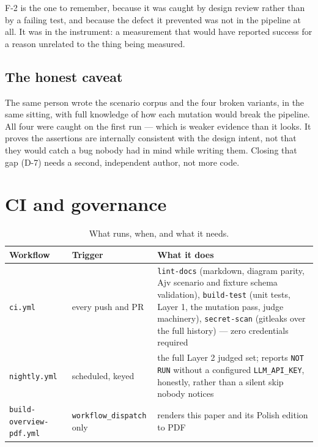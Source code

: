\documentclass[11pt,a4paper]{article}
\begin{document}
F-2 is the one to remember, because it was caught by design review rather than
by a failing test, and because the defect it prevented was not in the pipeline
at all. It was in the instrument: a measurement that would have reported
success for a reason unrelated to the thing being measured.

\subsection{The honest caveat}

The same person wrote the scenario corpus and the four broken variants, in the
same sitting, with full knowledge of how each mutation would break the
pipeline. All four were caught on the first run --- which is weaker evidence
than it looks. It proves the assertions are internally consistent with the
design intent, not that they would catch a bug nobody had in mind while
writing them. Closing that gap (D-7) needs a second, independent author, not
more code.

\section{CI and governance}

\begin{table}[htbp]
\centering
\caption{What runs, when, and what it needs.}
\begin{tabularx}{\linewidth}{@{}llX@{}}
\toprule
\textbf{Workflow} & \textbf{Trigger} & \textbf{What it does} \\
\midrule
\texttt{ci.yml} & every push and PR &
\texttt{lint-docs} (markdown, diagram parity, Ajv scenario and fixture schema
validation), \texttt{build-test} (unit tests, Layer 1, the mutation pass,
judge machinery), \texttt{secret-scan} (gitleaks over the full history) ---
zero credentials required \\
\addlinespace
\texttt{nightly.yml} & scheduled, keyed &
the full Layer 2 judged set; reports \texttt{NOT RUN} without a configured
\texttt{LLM\_API\_KEY}, honestly, rather than a silent skip nobody notices \\
\addlinespace
\texttt{build-overview-pdf.yml} & \texttt{workflow\_dispatch} only &
renders this paper and its Polish edition to PDF \\
\bottomrule
\end{tabularx}
\end{table}
\end{document}
